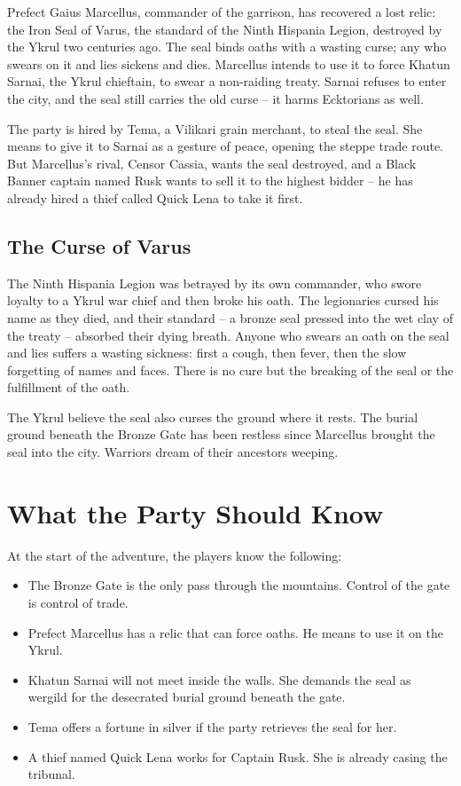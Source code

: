 \documentclass[10pt,twoside]{book}
\begin{document}
Prefect Gaius Marcellus, commander of the garrison, has recovered a lost relic: the Iron Seal of Varus, the standard of the Ninth Hispania Legion, destroyed by the Ykrul two centuries ago. The seal binds oaths with a wasting curse; any who swears on it and lies sickens and dies. Marcellus intends to use it to force Khatun Sarnai, the Ykrul chieftain, to swear a non-raiding treaty. Sarnai refuses to enter the city, and the seal still carries the old curse -- it harms Ecktorians as well.

The party is hired by Tema, a Vilikari grain merchant, to steal the seal. She means to give it to Sarnai as a gesture of peace, opening the steppe trade route. But Marcellus's rival, Censor Cassia, wants the seal destroyed, and a Black Banner captain named Rusk wants to sell it to the highest bidder -- he has already hired a thief called Quick Lena to take it first.

\subsection{The Curse of Varus}

The Ninth Hispania Legion was betrayed by its own commander, who swore loyalty to a Ykrul war chief and then broke his oath. The legionaries cursed his name as they died, and their standard -- a bronze seal pressed into the wet clay of the treaty -- absorbed their dying breath. Anyone who swears an oath on the seal and lies suffers a wasting sickness: first a cough, then fever, then the slow forgetting of names and faces. There is no cure but the breaking of the seal or the fulfillment of the oath.

The Ykrul believe the seal also curses the ground where it rests. The burial ground beneath the Bronze Gate has been restless since Marcellus brought the seal into the city. Warriors dream of their ancestors weeping.

\section{What the Party Should Know}

At the start of the adventure, the players know the following:

\begin{itemize}
\item The Bronze Gate is the only pass through the mountains. Control of the gate is control of trade.
\item Prefect Marcellus has a relic that can force oaths. He means to use it on the Ykrul.
\item Khatun Sarnai will not meet inside the walls. She demands the seal as wergild for the desecrated burial ground beneath the gate.
\item Tema offers a fortune in silver if the party retrieves the seal for her.
\item A thief named Quick Lena works for Captain Rusk. She is already casing the tribunal.
\end{itemize}
\end{document}

